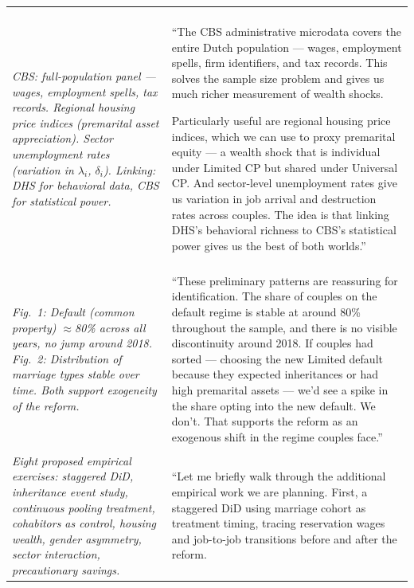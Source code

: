 \documentclass[11pt, a4paper]{article}
\begin{document}
\begin{longtable}{L{6cm} L{10cm}}
\\
\textit{CBS: full-population panel — wages, employment spells, tax records.
Regional housing price indices (premarital asset appreciation).
Sector unemployment rates (variation in $\lambda_i$, $\delta_i$).
Linking: DHS for behavioral data, CBS for statistical power.} &
``The CBS administrative microdata covers the entire Dutch population — wages, employment spells, firm identifiers, and tax records. This solves the sample size problem and gives us much richer measurement of wealth shocks.

Particularly useful are regional housing price indices, which we can use to proxy premarital equity — a wealth shock that is individual under Limited CP but shared under Universal CP. And sector-level unemployment rates give us variation in job arrival and destruction rates across couples. The idea is that linking DHS's behavioral richness to CBS's statistical power gives us the best of both worlds.'' \\[1em]

\\
\textit{Fig.\ 1: Default (common property) $\approx$80\% across all years, no jump around 2018.
Fig.\ 2: Distribution of marriage types stable over time.
Both support exogeneity of the reform.} &
``These preliminary patterns are reassuring for identification. The share of couples on the default regime is stable at around 80\% throughout the sample, and there is no visible discontinuity around 2018. If couples had sorted — choosing the new Limited default because they expected inheritances or had high premarital assets — we'd see a spike in the share opting into the new default. We don't. That supports the reform as an exogenous shift in the regime couples face.'' \\[1em]

\\
\textit{Eight proposed empirical exercises: staggered DiD, inheritance event study, continuous pooling treatment, cohabitors as control, housing wealth, gender asymmetry, sector interaction, precautionary savings.} &
``Let me briefly walk through the additional empirical work we are planning. First, a staggered DiD using marriage cohort as treatment timing, tracing reservation wages and job-to-job transitions before and after the reform.


\end{longtable}
\end{document}

